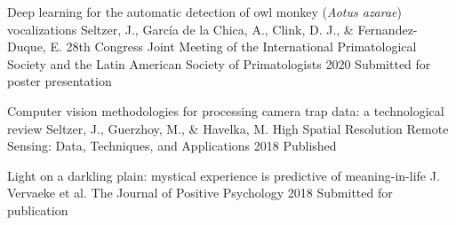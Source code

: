 

\begin{cvpubs}


  \cvpub
    {Deep learning for the automatic detection of owl monkey (\textit{Aotus azarae}) vocalizations} %
    {Seltzer, J., García de la Chica, A., Clink, D. J., \& Fernandez-Duque, E.} %
    {28th Congress Joint Meeting of the International Primatological Society and the Latin American Society of Primatologists} %
    {2020} %
    {Submitted for poster presentation} %

  \cvpub
    {Computer vision methodologies for processing camera trap data: a technological review} %
    {Seltzer, J., Guerzhoy, M., \& Havelka, M.} %
    {High Spatial Resolution Remote Sensing: Data, Techniques, and Applications} %
    {2018} %
    {Published} %

  \cvpub
    {Light on a darkling plain: mystical experience is predictive of meaning-in-life} %
    {J. Vervaeke et al.} %
    {The Journal of Positive Psychology} %
    {2018} %
    {Submitted for publication} %

\end{cvpubs}

